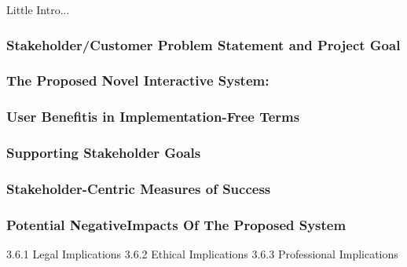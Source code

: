 Little Intro...
\subsubsection{Stakeholder/Customer Problem Statement and Project Goal}
\subsubsection{The Proposed Novel Interactive System:}
\subsubsection{User Benefitis in Implementation-Free Terms}
\subsubsection{Supporting Stakeholder Goals}
\subsubsection{Stakeholder-Centric Measures of Success}
\subsubsection{Potential NegativeImpacts Of The Proposed System}
3.6.1 Legal Implications
3.6.2 Ethical Implications
3.6.3 Professional Implications


